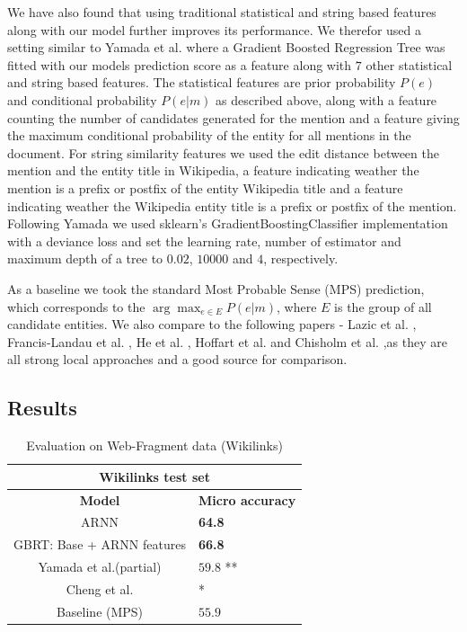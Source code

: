 \documentclass[11pt]{article}
\begin{document}
	We have also found that using traditional statistical and string based features along with our model further improves its performance. We therefor used a setting similar to Yamada et al.  where a Gradient Boosted Regression Tree was fitted with our models prediction score as a feature along with $7$ other statistical and string based features. The statistical features are prior probability $P(e)$ and conditional probability $P(e|m)$ as described above, along with a feature counting the number of candidates generated for the mention and a feature giving the maximum conditional probability of the entity for all mentions in the document. For string similarity features we used the edit distance between the mention and the entity title in Wikipedia, a feature indicating weather the mention is a prefix or postfix of the entity Wikipedia title and a feature indicating weather the Wikipedia entity title is a prefix or postfix of the mention. Following Yamada we used sklearn's GradientBoostingClassifier implementation \cite{pedregosa2011scikit} with a deviance loss and set the learning rate, number of estimator and maximum depth of a tree to $0.02$, $10000$ and $4$, respectively. 
	
	As a baseline we took the standard Most Probable Sense (MPS) prediction, which corresponds to the $\arg\max_{e\in{{E}}}{P(e|m)}$, where $E$ is the group of all candidate entities.
	We also compare to the following papers - Lazic et al. , Francis-Landau et al. , He et al. , Hoffart et al.  and Chisholm et al.  ,as they are all strong local approaches and a good source for comparison.
		
	\subsection{Results}
	
	\begin{table}[h]
		\begin{center}
			\begin{tabular}{|c| p{1.5cm}|}
				\hline \multicolumn{2}{|c|}{Wikilinks test set} \\
				\hline \bf Model & \bf Micro     accuracy  \\ \hline
				ARNN  &  \bf64.8\\
				GBRT: Base + ARNN features & \bf 66.8 \\
				Yamada et al.(partial) & $59.8$ ** \\
				Cheng et al. & * \\ 
				Baseline (MPS) & $55.9$ \\
				\hline
			\end{tabular}
		\end{center}
		\caption{\label{tab:b} Evaluation on Web-Fragment data (Wikilinks)}
	\end{table}
	
\end{document}
